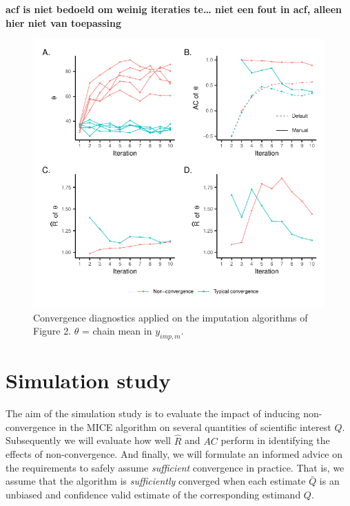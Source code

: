 \documentclass[Royal,times,sageh]{sagej}
\begin{document}
\textbf{acf is niet bedoeld om weinig iteraties te\ldots{} niet een fout
in acf, alleen hier niet van toepassing}

\begin{figure}

{\centering \includegraphics{manuscript_files/figure-latex/diagnostics-1} 

}

\caption{Convergence diagnostics applied on the imputation algorithms of Figure 2. $\theta$ = chain mean in $y_{imp, m}$.}\label{fig:diagnostics}
\end{figure}

\hypertarget{simulation-study}{%
\section{Simulation study}\label{simulation-study}}

The aim of the simulation study is to evaluate the impact of inducing
non-convergence in the MICE algorithm on several quantities of
scientific interest \(Q\). Subsequently we will evaluate how well
\(\widehat{R}\) and \(AC\) perform in identifying the effects of
non-convergence. And finally, we will formulate an informed advice on
the requirements to safely assume \emph{sufficient} convergence in
practice. That is, we assume that the algorithm is \emph{sufficiently}
converged when each estimate \(\bar{Q}\) is an unbiased and confidence
valid estimate of the corresponding estimand \(Q\).
\end{document}
